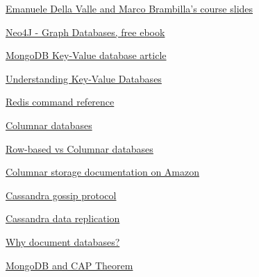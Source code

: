\documentclass[10pt,a4paper]{article}
\begin{document}
  


\begin{thebibliography}{1}
\newblock\href{http://datascience.deib.polimi.it/course/unstructured-and-streaming-data-engineering/}{Emanuele Della Valle and Marco Brambilla's course slides}

\newblock \href{https://neo4j.com/graph-databases-book/?ref=home}{Neo4J - Graph Databases, free ebook}

\newblock \href{https://www.mongodb.com/key-value-database}{MongoDB Key-Value database article}

\newblock \href{https://www.dataversity.net/understanding-key-value-databases/}{Understanding Key-Value Databases}

\newblock \href{https://redis.io/commands}{Redis command reference}

\newblock\href{https://www.stitchdata.com/columnardatabase/}{Columnar databases}

\newblock \href{https://medium.com/@mangatmodi/rowise-vs-columnar-database-theory-and-in-practice-53f54c8f6505}{Row-based vs Columnar databases}

\newblock \href{https://docs.aws.amazon.com/redshift/latest/dg/c_columnar_storage_disk_mem_mgmnt.html}{Columnar storage documentation on Amazon}

\newblock \href{https://docs.datastax.com/en/cassandra-oss/3.0/cassandra/architecture/archGossipAbout.html}{Cassandra gossip protocol}

\newblock \href{https://www.guru99.com/cassandra-architecture.html#:~:text=There\%20are\%20two\%20kinds\%20of\%20replication\%20strategies\%20in\%20Cassandra.&text=SimpleStrategy\%20is\%20used\%20when\%20you,direction\%20in\%20the\%20Node\%20ring.}{Cassandra data replication}

\newblock \href{https://www.mongodb.com/document-databases}{Why document databases?}

\newblock \href{https://www.ibm.com/cloud/learn/cap-theorem#toc-mongodb-an-IH4u4oCK}{MongoDB and CAP Theorem}


\end{thebibliography}
\end{document}
